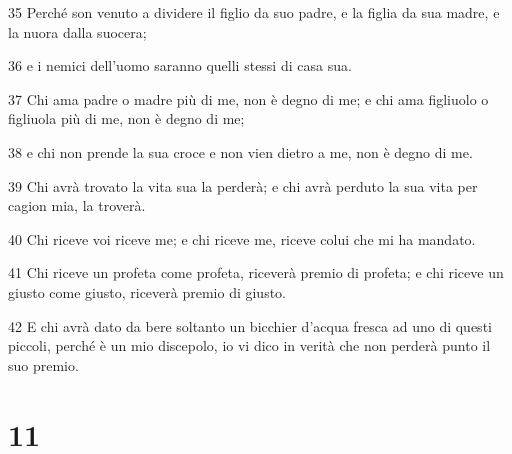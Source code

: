 \par 35 Perché son venuto a dividere il figlio da suo padre, e la figlia da sua madre, e la nuora dalla suocera;
\par 36 e i nemici dell'uomo saranno quelli stessi di casa sua.
\par 37 Chi ama padre o madre più di me, non è degno di me; e chi ama figliuolo o figliuola più di me, non è degno di me;
\par 38 e chi non prende la sua croce e non vien dietro a me, non è degno di me.
\par 39 Chi avrà trovato la vita sua la perderà; e chi avrà perduto la sua vita per cagion mia, la troverà.
\par 40 Chi riceve voi riceve me; e chi riceve me, riceve colui che mi ha mandato.
\par 41 Chi riceve un profeta come profeta, riceverà premio di profeta; e chi riceve un giusto come giusto, riceverà premio di giusto.
\par 42 E chi avrà dato da bere soltanto un bicchier d'acqua fresca ad uno di questi piccoli, perché è un mio discepolo, io vi dico in verità che non perderà punto il suo premio.

\chapter{11}

